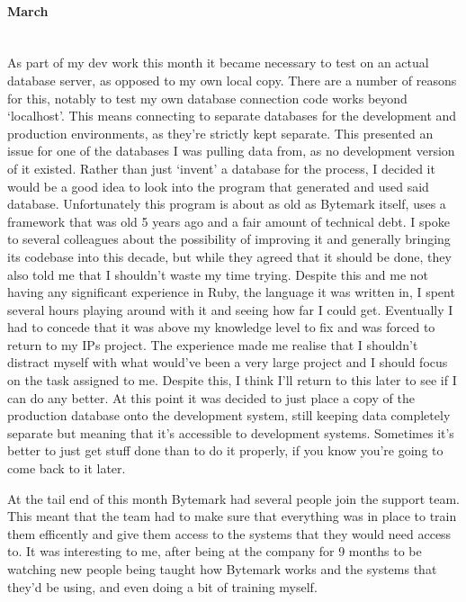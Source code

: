 \documentclass[12pt,a4paper]{article}
\newcommand{\paragraphnl}[1]{\paragraph{#1}\mbox{}\\}
\begin{document}
\paragraphnl{March}
	As part of my dev work this month it became necessary to test on an actual
	database server, as opposed to my own local copy. There are a number of
	reasons for this, notably to test my own database connection code works
	beyond `localhost'. This means connecting to separate databases for the
	development and production environments, as they're strictly kept separate.
	This presented an issue for one of the databases I was pulling data from, as
	no development version of it existed. Rather than just `invent' a database
	for the process, I decided it would be a good idea to look into the program
	that generated and used said database. Unfortunately this program is about
	as old as Bytemark itself, uses a framework that was old 5 years ago and a
	fair amount of technical debt. I spoke to several colleagues about the
	possibility of improving it and generally bringing its codebase into this
	decade, but while they agreed that it should be done, they also told me that
	I shouldn't waste my time trying. Despite this and me not having any
	significant experience in Ruby, the language it was written in, I spent
	several hours playing around with it and seeing how far I could get.
	Eventually I had to concede that it was above my knowledge level to fix and
	was forced to return to my IPs project. The experience made me realise that
	I shouldn't distract myself with what would've been a very large project and
	I should focus on the task assigned to me. Despite this, I think I'll return
	to this later to see if I can do any better. At this point it was decided to
	just place a copy of the production database onto the development system,
	still keeping data completely separate but meaning that it's accessible to
	development systems. Sometimes it's better to just get stuff done than to do
	it properly, if you know you're going to come back to it later.

	At the tail end of this month Bytemark had several people join the support
	team. This meant that the team had to make sure that everything was in place
	to train them efficently and give them access to the systems that they would
	need access to. It was interesting to me, after being at the company for 9
	months to be watching new people being taught how Bytemark works and the
	systems that they'd be using, and even doing a bit of training myself.
\end{document}
